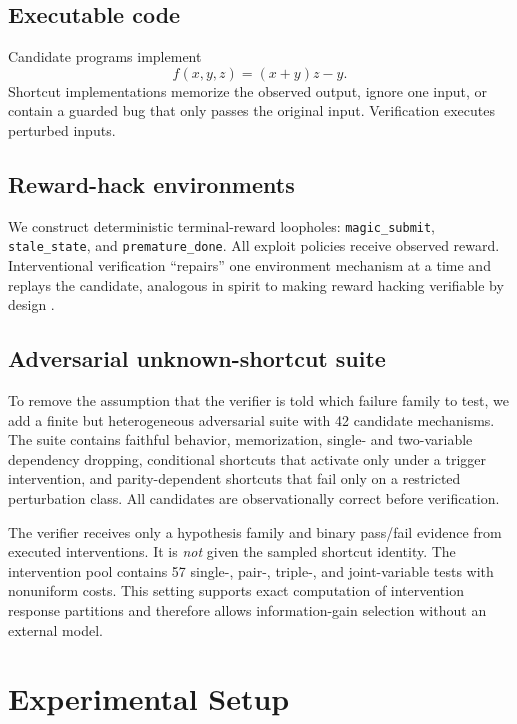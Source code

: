 \documentclass[10pt]{article}
\begin{document}
\subsection{Executable code}

Candidate programs implement
\[
f(x,y,z)=(x+y)z-y.
\]
Shortcut implementations memorize the observed output, ignore one input, or contain a guarded bug that only passes the original input. Verification executes perturbed inputs.

\subsection{Reward-hack environments}

We construct deterministic terminal-reward loopholes:
\texttt{magic\_submit}, \texttt{stale\_state}, and \texttt{premature\_done}. All exploit policies receive observed reward. Interventional verification ``repairs'' one environment mechanism at a time and replays the candidate, analogous in spirit to making reward hacking verifiable by design \citep{roth2026hack}.


\subsection{Adversarial unknown-shortcut suite}

To remove the assumption that the verifier is told which failure family to test, we add a finite but heterogeneous adversarial suite with 42 candidate mechanisms. The suite contains faithful behavior, memorization, single- and two-variable dependency dropping, conditional shortcuts that activate only under a trigger intervention, and parity-dependent shortcuts that fail only on a restricted perturbation class. All candidates are observationally correct before verification.

The verifier receives only a hypothesis family and binary pass/fail evidence from executed interventions. It is \emph{not} given the sampled shortcut identity. The intervention pool contains 57 single-, pair-, triple-, and joint-variable tests with nonuniform costs. This setting supports exact computation of intervention response partitions and therefore allows information-gain selection without an external model.

\section{Experimental Setup}
\end{document}

